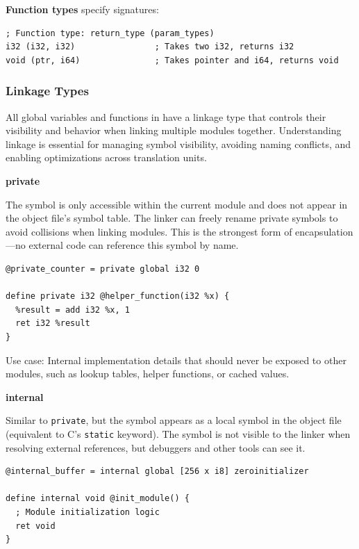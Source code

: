 \textbf{Function types} specify signatures:

\begin{lstlisting}[style=ir]
; Function type: return_type (param_types)
i32 (i32, i32)                ; Takes two i32, returns i32
void (ptr, i64)               ; Takes pointer and i64, returns void
\end{lstlisting}

\subsubsection*{Linkage Types}

All global variables and functions in  have a linkage type that controls their visibility and behavior when linking multiple modules together.
Understanding linkage is essential for managing symbol visibility, avoiding naming conflicts, and enabling optimizations across translation units.

\textbf{private}

The symbol is only accessible within the current module and does not appear in the object file's symbol table.
The linker can freely rename private symbols to avoid collisions when linking modules.
This is the strongest form of encapsulation---no external code can reference this symbol by name.

\begin{lstlisting}[style=ir]
@private_counter = private global i32 0

define private i32 @helper_function(i32 %x) {
  %result = add i32 %x, 1
  ret i32 %result
}
\end{lstlisting}

Use case: Internal implementation details that should never be exposed to other modules, such as lookup tables, helper functions, or cached values.

\textbf{internal}

Similar to \texttt{private}, but the symbol appears as a local symbol in the object file (equivalent to C's \texttt{static} keyword). The symbol is not visible to the linker when resolving external references, but debuggers and other tools can see it.

\begin{lstlisting}[style=ir]
@internal_buffer = internal global [256 x i8] zeroinitializer

define internal void @init_module() {
  ; Module initialization logic
  ret void
}
\end{lstlisting}

